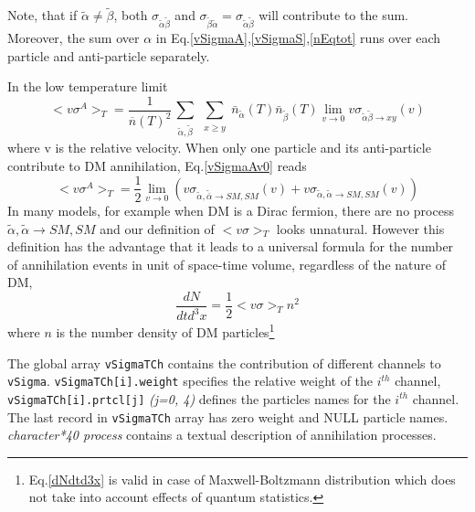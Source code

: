 \documentclass[12pt,a4paper]{article}
\begin{document}
 Note, that if $\tilde\alpha \ne \tilde\beta$, both 
${\sigma}_{\tilde\alpha\tilde\beta}$ and  ${\sigma}_{\tilde\beta\tilde\alpha}={\sigma}_{\tilde\alpha\tilde\beta}$ will contribute to the sum. Moreover, 
 the sum over $\alpha$ in Eq.\ref{vSigmaA},\ref{vSigmaS},\ref{nEqtot} 
 runs over  each  particle and anti-particle separately. 
 

  In the low temperature limit 
\begin{equation}
\label{vSigmaAv0}
<v\sigma^A>_T = \frac{1}{\overline{n}(T)^2}   
\sum_{\substack{
\tilde\alpha ,\tilde\beta }}  
\sum_{\substack{ x \ge y }} \bar{n}_{\tilde{\alpha}}(T) \bar{n}_{\tilde{\beta}}(T)  { \lim_{v \to 0}}  v\sigma_{\tilde\alpha\tilde\beta\to x y}(v)    
\end{equation} 
where v is the relative velocity.  When only one  particle and its anti-particle  contribute to DM annihilation, Eq.\ref{vSigmaAv0} reads 
\begin{equation}
<v\sigma^A>_T =\frac{1}{2} \lim_{v\to 0} ( v \sigma_{\tilde{\alpha},\tilde{\bar{\alpha}} \to SM,SM }(v) + v \sigma_{\tilde{\alpha},\tilde{\alpha} \to SM,SM }(v)) 
\end{equation} 
In many models, for example when DM is a Dirac fermion,   there are no process $ \tilde{\alpha},\tilde{\alpha} \to SM,SM $ and our definition of $<v\sigma>_T $ looks   
unnatural. However this definition has the advantage that it  leads to a universal formula for the number of annihilation events in unit of space-time volume, regardless of the nature of DM, 
\begin{equation}
\label{dNdtd3x}  
  \frac{dN}{dt d^3x}= \frac{1}{2} <v\sigma>_T n^2 
\end{equation}
where $n$ is the number density of DM particles\footnote{Eq.\ref{dNdtd3x} is valid in case of Maxwell-Boltzmann distribution which does not take into account effects of  quantum statistics.}



The global array {\tt vSigmaTCh} contains the 
contribution of different channels to {\tt vSigma}. \verb|vSigmaTCh[i].weight| specifies the relative
weight of the $i^{th}$ channel, \\
\verb|vSigmaTCh[i].prtcl[j]|  {\it (j=0, 4)}  defines the particles names for the $i^{th}$
channel.\\
The last record in \verb|vSigmaTCh| array has zero weight and 
NULL particle names.  {\it character*40  process}
contains a textual description of annihilation processes.\\
\end{document}
